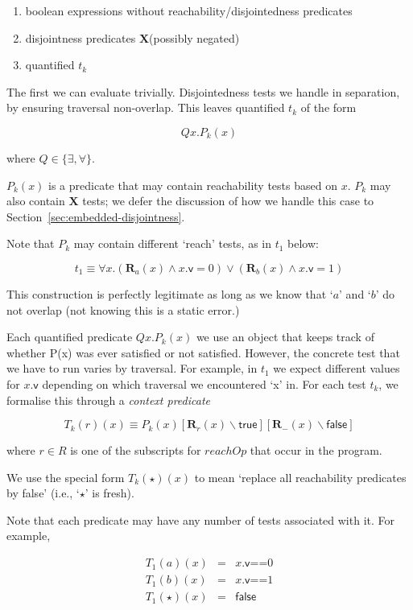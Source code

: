 \documentclass{report}
\newcommand{\reachOp}{\ensuremath{\mathbf{R}}}
\newcommand{\reach}[1]{\ensuremath{\reachOp_{#1}}}
\newcommand{\disjointOp}{\ensuremath{\mathbf{X}}}
\begin{document}
\begin{enumerate}
\item boolean expressions without reachability/disjointedness predicates
\item disjointness predicates \disjointOp (possibly negated)
\item quantified $t_k$
\end{enumerate}

The first we can evaluate trivially.  Disjointedness tests we handle
in separation, by ensuring traversal non-overlap.
This leaves quantified $t_k$ of the form

\[
  Q x. P_k(x)
\]

where $Q \in \{ \exists, \forall \}$.

$P_k(x)$ is a predicate that may contain reachability tests based on
$x$.  $P_k$ may also contain $\disjointOp$ tests; we defer the
discussion of how we handle this case to
Section~\ref{sec:embedded-disjointness}.

Note that $P_k$ may contain different `reach' tests, as in $t_1$ below:

\[
  t_1 \equiv  \forall x. (\reach{a}(x) \wedge x.\textsf{v} = 0) \vee (\reach{b}(x) \wedge x.\textsf{v} = 1)
\]

  This construction is perfectly legitimate as long as we know that
`$a$' and `$b$' do not overlap (not knowing this is a static error.)

Each quantified predicate
$Q x. P_k(x)$
  we use an object that keeps track of whether P(x) was ever
satisfied or not satisfied.  However, the concrete test that we have
to run varies by traversal.  For example, in $t_1$ we expect different
values for $x.\textsf{v}$ depending on which traversal we encountered `\textsf{x}' in.
For each test $t_k$, we formalise this through a \emph{context predicate}

\[
  T_k(r)(x) \equiv P_k(x)[\reach{r}(x) \backslash \textsf{true}][\reach{-}(x) \backslash \textsf{false}]
\]

where $r \in R$ is one of the subscripts for $reachOp$ that occur in
the program.

We use the special form $T_k(\star)(x)$ to mean `replace all reachability
predicates by false' (i.e., `$\star$' is fresh).

  Note that each predicate may have any number of tests associated
with it.  For example,

\begin{eqnarray*}
  T_1(a)(x) &=& x.\textsf{v} \textsf{==} 0 \\
  T_1(b)(x) &=& x.\textsf{v} \textsf{==} 1 \\
  T_1(\star)(x) &=& \textsf{false}
\end{eqnarray*}
\end{document}

